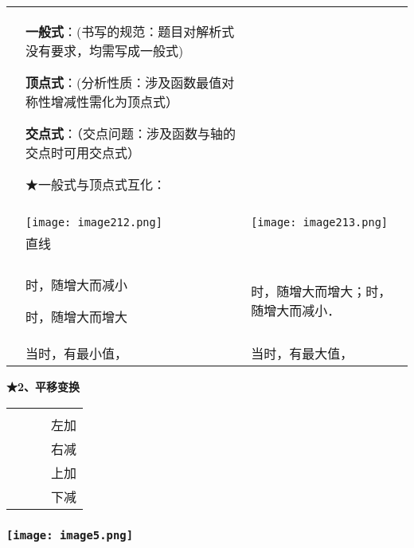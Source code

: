 \begin{longtable}[]{@{}lll@{}}
\toprule
\endhead
\begin{minipage}[t]{0.30\columnwidth}\raggedright
\strut
\end{minipage} & \begin{minipage}[t]{0.30\columnwidth}\raggedright
\textbf{一般式}：(书写的规范：题目对解析式没有要求，均需写成一般式)

\textbf{顶点式}：(分析性质：涉及函数最值对称性增减性需化为顶点式）

\textbf{交点式}：（交点问题：涉及函数与轴的交点时可用交点式）

★一般式与顶点式互化：\strut
\end{minipage} & \begin{minipage}[t]{0.30\columnwidth}\raggedright
\strut
\end{minipage}\tabularnewline
& &\tabularnewline
&
\texttt{[image: image212.png]}
&
\texttt{[image: image213.png]}\tabularnewline
& 直线 &\tabularnewline
& &\tabularnewline
\begin{minipage}[t]{0.30\columnwidth}\raggedright
\strut
\end{minipage} & \begin{minipage}[t]{0.30\columnwidth}\raggedright
时，随增大而减小

时，随增大而增大\strut
\end{minipage} & \begin{minipage}[t]{0.30\columnwidth}\raggedright
时，随增大而增大；时，随增大而减小．\strut
\end{minipage}\tabularnewline
& 当时，有最小值， & 当时，有最大值，\tabularnewline
\bottomrule
\end{longtable}

\textbf{★2、平移变换}

\begin{longtable}[]{@{}llll@{}}
\toprule
\endhead
& & &\tabularnewline
& & & 左加\tabularnewline
& & & 右减\tabularnewline
& & & 上加\tabularnewline
& & & 下减\tabularnewline
\bottomrule
\end{longtable}

\hypertarget{ux5b66ux79d1ux7f51www.zxxk.com--ux6559ux80b2ux8d44ux6e90ux95e8ux6237ux63d0ux4f9bux8bd5ux9898ux8bd5ux5377ux6559ux6848ux8bfeux4ef6ux6559ux5b66ux8bbaux6587ux7d20ux6750ux7b49ux5404ux7c7bux6559ux5b66ux8d44ux6e90ux5e93ux4e0bux8f7dux8fd8ux6709ux5927ux91cfux4e30ux5bccux7684ux6559ux5b66ux8d44ux8baf-40}{%
\subsubsection{\texorpdfstring{\protect\texttt{[image: image5.png]}}{学科网(www.zxxk.com)-\/-教育资源门户，提供试题试卷、教案、课件、教学论文、素材等各类教学资源库下载，还有大量丰富的教学资讯！}}\label{ux5b66ux79d1ux7f51www.zxxk.com--ux6559ux80b2ux8d44ux6e90ux95e8ux6237ux63d0ux4f9bux8bd5ux9898ux8bd5ux5377ux6559ux6848ux8bfeux4ef6ux6559ux5b66ux8bbaux6587ux7d20ux6750ux7b49ux5404ux7c7bux6559ux5b66ux8d44ux6e90ux5e93ux4e0bux8f7dux8fd8ux6709ux5927ux91cfux4e30ux5bccux7684ux6559ux5b66ux8d44ux8baf-40}}

